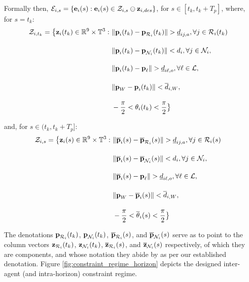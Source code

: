 Formally then, $\mathcal{E}_{i,s} = \{ \bm{\mathbf{e}}_i(s): \bm{\mathbf{e}}_i(s) \in \mathcal{Z}_{i,s} \ominus \bm{\mathbf{z}}_{i,des}\}$,
for $s \in [t_k, t_k + T_p]$, where, for $s = t_k$:
\begin{align}
  \mathcal{Z}_{i,t_k} = \big\{\bm{\mathbf{z}}_i(t_k) \in \mathbb{R}^{9}\times \mathbb{T}^3 : \
      & \|\bm{\mathbf{p}}_i(t_k) - \bm{\mathbf{p}}_{\mathcal{R}_i}(t_k)\| > \underline{d}_{ij,a}, \forall j \in \mathcal{R}_i(t_k)\\[2.5ex]
      & \|\bm{\mathbf{p}}_i(t_k) - \bm{\mathbf{p}}_{\mathcal{N}_i}(t_k)\| < d_i, \forall j \in \mathcal{N}_i, \\[2.5ex]
      & \|\bm{\mathbf{p}}_i(t_k) - \bm{\mathbf{p}}_{\ell}\| > \underline{d}_{i\ell,o}, \forall \ell \in \mathcal{L}, \\[2.5ex]
      & \|\bm{\mathbf{p}}_W - \bm{\mathbf{p}}_i(t_k)\| < \overline{d}_{i,W}, \\[2.5ex]
      & - \frac{\pi}{2} < \theta_i(t_k) < \frac{\pi}{2} \big\}
\end{align}

and, for $s \in (t_k, t_k + T_p]$:
\begin{align}
  \mathcal{Z}_{i,s} = \big\{\bm{\mathbf{z}}_i(s) \in \mathbb{R}^{9}\times \mathbb{T}^3 : \
      & \|\overline{\bm{\mathbf{p}}}_i(s) - \overline{\bm{\mathbf{p}}}_{\mathcal{R}_i}(s)\| > \underline{d}_{ij,a}, \forall j \in \mathcal{R}_i(s)\\[2.5ex]
      & \|\overline{\bm{\mathbf{p}}}_i(s) - \overline{\bm{\mathbf{p}}}_{\mathcal{N}_i}(s)\| < d_i, \forall j \in \mathcal{N}_i, \\[2.5ex]
      & \|\overline{\bm{\mathbf{p}}}_i(s) - \bm{\mathbf{p}}_{\ell}\| > \underline{d}_{i\ell,o}, \forall \ell \in \mathcal{L}, \\[2.5ex]
      & \|\bm{\mathbf{p}}_W - \overline{\bm{\mathbf{p}}}_i(s)\| < \overline{d}_{i,W}, \\[2.5ex]
      & - \frac{\pi}{2} < \overline{\theta}_i(s) < \frac{\pi}{2} \big\}
\end{align}

The denotations $\bm{\mathbf{p}}_{\mathcal{R}_i}(t_k)$, $\bm{\mathbf{p}}_{\mathcal{N}_i}(t_k)$,
$\overline{\bm{\mathbf{p}}}_{\mathcal{R}_i}(s)$, and $\overline{\bm{\mathbf{p}}}_{\mathcal{N}_i}(s)$
serve as to point to the column vectors $\bm{\mathbf{z}}_{\mathcal{R}_i}(t_k)$,
$\bm{\mathbf{z}}_{\mathcal{N}_i}(t_k)$, $\overline{\bm{\mathbf{z}}}_{\mathcal{R}_i}(s)$, and
$\overline{\bm{\mathbf{z}}}_{\mathcal{N}_i}(s)$ respectively, of which they are
components, and whose notation they abide by as per our established denotation.
Figure \eqref{fig:constraint_regime_horizon} depicts the designed inter-agent
(and intra-horizon) constraint regime.\\[2.5ex]

